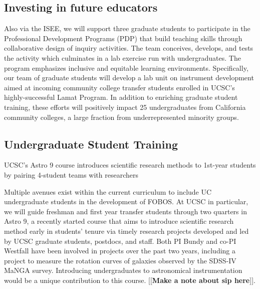 \documentclass[oneside,11pt]{amsart}
\newcommand{\comment}[2][todo]{{\color{#1}[[{\bf #2}]]}}
\begin{document}
\subsection{Investing in future educators} Also via the ISEE, we will
support three graduate students to participate in the Professional Development Programs (PDP) that build teaching
skills through collaborative design of inquiry activities.  The team conceives, develops, and tests the activity which
culminates in a lab exercise run with undergraduates.  The program emphasizes inclusive and equitable learning
environments.  Specifically, our team of graduate students will develop a lab unit on instrument development aimed at
incoming community college transfer students enrolled in UCSC's highly-successful Lamat Program.  In addition to
enriching graduate student training, these efforts will positively impact 25 undergraduates from California community
colleges, a large fraction from underrepresented minority groups.

\subsection{Undergraduate Student Training} UCSC's Astro 9 course introduces scientific research methods to 1st-year
students by pairing 4-student teams with researchers 

Multiple avenues exist
within the current curriculum to include UC undergraduate students in
the development of FOBOS.  At UCSC in particular,
we will guide freshman and first year transfer students through two
quarters in Astro 9, a recently started course that aims to introduce
scientific research method early in students' tenure via timely research
projects developed and led by UCSC graduate students, postdocs, and
staff.  Both PI Bundy and co-PI Westfall have been involved in projects
over the past two years, including a project to measure the rotation
curves of galaxies observed by the SDSS-IV MaNGA survey.  Introducing
undergraduates to astronomical instrumentation would be a unique
contribution to this course.
\comment{Make a note about sip here}.


\end{document}
